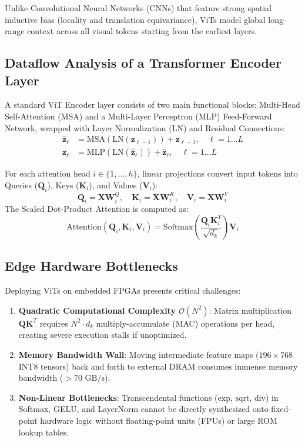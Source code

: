 \documentclass[11pt,a4paper]{article}
\begin{document}
Unlike Convolutional Neural Networks (CNNs) that feature strong spatial inductive bias (locality and translation equivariance), ViTs model global long-range context across all visual tokens starting from the earliest layers.

\subsection{Dataflow Analysis of a Transformer Encoder Layer}
A standard ViT Encoder layer consists of two main functional blocks: Multi-Head Self-Attention (MSA) and a Multi-Layer Perceptron (MLP) Feed-Forward Network, wrapped with Layer Normalization ($\text{LN}$) and Residual Connections:
\begin{align}
\mathbf{\hat{z}}_\ell &= \text{MSA}(\text{LN}(\mathbf{z}_{\ell-1})) + \mathbf{z}_{\ell-1}, \quad \ell = 1 \dots L \\
\mathbf{z}_\ell &= \text{MLP}(\text{LN}(\mathbf{\hat{z}}_\ell)) + \mathbf{\hat{z}}_\ell, \quad \ell = 1 \dots L
\end{align}

For each attention head $i \in \{1, \dots, h\}$, linear projections convert input tokens into Queries ($\mathbf{Q}_i$), Keys ($\mathbf{K}_i$), and Values ($\mathbf{V}_i$):
\begin{equation}
\mathbf{Q}_i = \mathbf{X} \mathbf{W}_i^Q, \quad \mathbf{K}_i = \mathbf{X} \mathbf{W}_i^K, \quad \mathbf{V}_i = \mathbf{X} \mathbf{W}_i^V
\end{equation}
The Scaled Dot-Product Attention is computed as:
\begin{equation}
\text{Attention}(\mathbf{Q}_i, \mathbf{K}_i, \mathbf{V}_i) = \text{Softmax}\left( \frac{\mathbf{Q}_i \mathbf{K}_i^T}{\sqrt{d_k}} \right) \mathbf{V}_i
\end{equation}

\subsection{Edge Hardware Bottlenecks}
Deploying ViTs on embedded FPGAs presents critical challenges:
\begin{enumerate}
    \item \textbf{Quadratic Computational Complexity $\mathcal{O}(N^2)$}: Matrix multiplication $\mathbf{Q} \mathbf{K}^T$ requires $N^2 \cdot d_k$ multiply-accumulate (MAC) operations per head, creating severe execution stalls if unoptimized.
    \item \textbf{Memory Bandwidth Wall}: Moving intermediate feature maps ($196 \times 768$ INT8 tensors) back and forth to external DRAM consumes immense memory bandwidth ($>70\text{ GB/s}$).
    \item \textbf{Non-Linear Bottlenecks}: Transcendental functions ($\text{exp}$, $\text{sqrt}$, $\text{div}$) in Softmax, GELU, and LayerNorm cannot be directly synthesized onto fixed-point hardware logic without floating-point units (FPUs) or large ROM lookup tables.
\end{enumerate}
\end{document}
